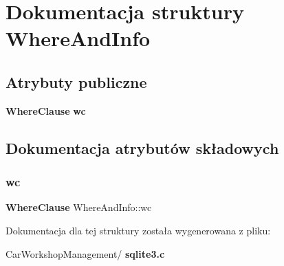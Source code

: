 \section{Dokumentacja struktury Where\+And\+Info}
\label{struct_where_and_info}
\subsection*{Atrybuty publiczne}
\begin{DoxyCompactItemize}
\item 
\textbf{ Where\+Clause} \textbf{ wc}
\end{DoxyCompactItemize}


\subsection{Dokumentacja atrybutów składowych}
\mbox{\label{struct_where_and_info_a01cea99f069b1e598004a1cd0d0c3a80}} 
\subsubsection{wc}
{\footnotesize\ttfamily \textbf{ Where\+Clause} Where\+And\+Info\+::wc}



Dokumentacja dla tej struktury została wygenerowana z pliku\+:\begin{DoxyCompactItemize}
\item 
Car\+Workshop\+Management/\textbf{ sqlite3.\+c}\end{DoxyCompactItemize}
